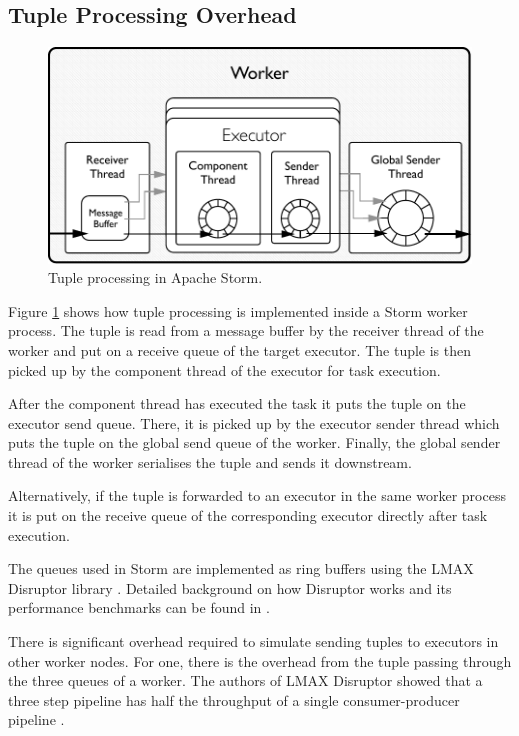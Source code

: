 \documentclass[bsc,logo,frontabs,twoside,singlespacing,normalheadings,parskip]{infthesis}\usepackage[]{graphicx}\usepackage[]{color}
\begin{document}
\subsection{Tuple Processing Overhead}

\begin{figure}[!htb]
	\centering
	\includegraphics[scale=0.7]{pdf/worker_inside.pdf}
	\caption{Tuple processing in Apache Storm.}
	\label{fig:worker_inside}
\end{figure}

Figure \ref{fig:worker_inside} shows how tuple processing is implemented inside a Storm worker process. The tuple is read from a message buffer by the receiver thread of the worker and put on a receive queue of the target executor. The tuple is then picked up by the component thread of the executor for task execution.

After the component thread has executed the task it puts the tuple on the executor send queue. There, it is picked up by the executor sender thread which puts the tuple on the global send queue of the worker. Finally, the global sender thread of the worker serialises the tuple and sends it downstream.

Alternatively, if the tuple is forwarded to an executor in the same worker process it is put on the receive queue of the corresponding executor directly after task execution.

The queues used in Storm are implemented as ring buffers using the LMAX Disruptor library \citep{LMAXDisruptor}. Detailed background on how Disruptor works and its performance benchmarks can be found in \citep{Thompson_Farley_Barker_Gee_Stewart_2011}.

There is significant overhead required to simulate sending tuples to executors in other worker nodes. For one, there is the overhead from the tuple passing through the three queues of a worker. The authors of LMAX Disruptor showed that a three step pipeline has half the throughput of a single consumer-producer pipeline \citep{DisruptorWiki}.
\end{document}
